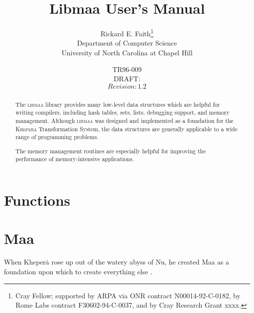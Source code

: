 \documentclass[draft]{article}
\newcommand{\libmaa}{\textsc{libmaa}\xspace}
\newcommand{\kheperalong}{\textsc{Khepera} Transformation System\xspace}
\newcommand{\Khepera}{Kheper\.a\xspace}
\newcommand{\Maa}{Maa\xspace}
\begin{document}
 \title{Libmaa User's Manual}

\author{Rickard E. Faith\thanks{Cray Fellow; supported by ARPA via ONR
    contract N00014-92-C-0182, by Rome Labs contract F30602-94-C-0037, and
    by Cray Research Grant xxxx.}
  \\ Department of Computer Science
  \\ University of North Carolina at Chapel Hill}
\date{TR96-009 \\ DRAFT: \FileRevised \\ $Revision: 1.2 $}

\maketitle\tableofcontents

\clearpage

\begin{abstract}
  The \libmaa library provides many low-level data structures which are
  helpful for writing compilers, including hash tables, sets, lists,
  debugging support, and memory management.  Although \libmaa was designed
  and implemented as a foundation for the \kheperalong, the data structures
  are generally applicable to a wide range of programming problems.

  The memory management routines are especially helpful for improving the
  performance of memory-intensive applications.
\end{abstract}

\clearpage
\section{Functions}


\clearpage
\appendix

\section{\Maa}

When \Khepera rose up out of the watery abyss of Nu, he created \Maa as a
foundation upon which to create everything else
\cite[pp.~295--8]{faith:Budge04b}.


\end{document}

